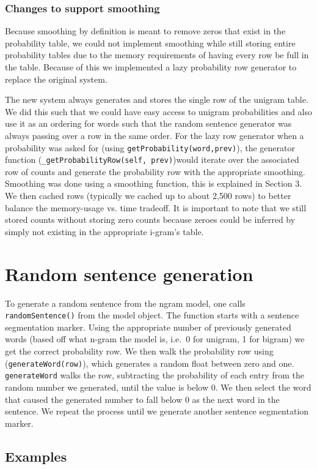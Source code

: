 \documentclass{article}
\begin{document}
\subsubsection{Changes to support smoothing}
Because smoothing by definition is meant to remove zeros that exist in the probability table, we could not implement smoothing while still storing entire probability tables due to the memory requirements of having every row be full in the table. Because of this we implemented a lazy probability row generator to replace the original system.

The new system always generates and stores the single row of the unigram table. We did this such that we could have easy access to unigram probabilities and also use it as an ordering for words such that the random sentence generator was always passing over a row in the same order. For the lazy row generator when a probability was asked for (using \texttt{getProbability(word,prev)}), the generator function (\texttt{\_getProbabilityRow(self, prev)})would iterate over the associated row of counts and generate the probability row with the appropriate smoothing. Smoothing was done using a smoothing function, this is explained in Section 3. We then cached rows (typically we cached up to about 2,500 rows) to better balance the memory-usage vs. time tradeoff. It is important to note that we still stored counts without storing zero counts because zeroes could be inferred by simply not existing in the appropriate i-gram's table.

\section{Random sentence generation}
To generate a random sentence from the ngram model, one calls \texttt{randomSentence()} from the model object. The function starts with a sentence segmentation marker. Using the appropriate number of previously generated words (based off what n-gram the model is, i.e.\ 0 for unigram, 1 for bigram) we get the correct probability row. We then walk the probability row using (\texttt{generateWord(row)}), which generates a random float between zero and one. \texttt{generateWord} walks the row, subtracting the probability of each entry from the random number we generated, until the value is below 0. We then select the word that caused the generated number to fall below 0 as the next word in the sentence. We repeat the process until we generate another sentence segmentation marker.

\subsection{Examples}
\end{document}
